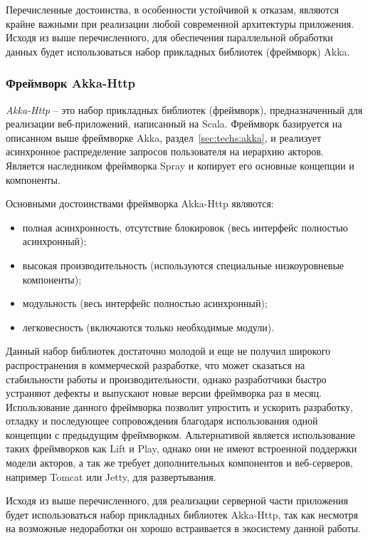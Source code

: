 Перечисленные достоинства, в особенности устойчивой к отказам, являются крайне важными при реализации любой современной архитектуры приложения. Исходя из выше перечисленного, для обеспечения параллельной обработки данных будет использоваться набор прикладных библиотек (фреймворк) Akka.

\subsubsection{Фреймворк Akka-Http}
\label{sec:techs:akka_http}

\emph{Akka-Http} -- это набор прикладных библиотек (фреймворк), предназначенный для реализации веб-приложений, написанный на Scala. Фреймворк базируется на описанном выше фреймворке Akka, раздел~\ref{sec:techs:akka}, и реализует асинхронное распределение запросов пользователя на иерархию акторов. Является наследником фреймворка Spray и копирует его основные концепции и компоненты.

Основными достоинствами фреймворка Akka-Http являются:
\begin{itemize}
  \item полная асинхронность, отсутствие блокировок (весь интерфейс полностью асинхронный);
  \item высокая производительность (используются специальные низкоуровневые компоненты);
  \item модульность (весь интерфейс полностью асинхронный);
  \item легковесность (включаются только необходимые модули).
\end{itemize}

Данный набор библиотек достаточно молодой и еще не получил широкого распространения в коммерческой разработке, что может сказаться на стабильности работы и производительности, однако разработчики быстро устраняют дефекты и выпускают новые версии фреймворка раз в месяц. Использование данного фреймворка позволит упростить и ускорить разработку, отладку и последующее сопровождения благодаря использования одной концепции с предыдущим фреймворком.
Альтернативой является использование таких фреймворков как Lift и Play, однако они не имеют встроенной поддержки модели акторов, а так же требует дополнительных компонентов и веб-серверов, например Tomcat или Jetty, для развертывания.

Исходя из выше перечисленного, для реализации серверной части приложения будет использоваться набор прикладных библиотек Akka-Http, так как несмотря на возможные недоработки он хорошо встраивается в экосистему данной работы.

